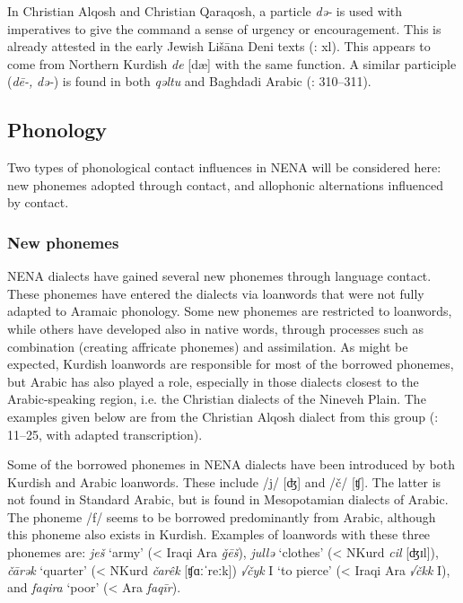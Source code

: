 \documentclass[output=paper]{langsci/langscibook}
\begin{document}
In Christian Alqosh and Christian Qaraqosh, a particle \textit{də\nobreakdash-} is used with imperatives to give the command a sense of urgency or encouragement. This is already attested in the early Jewish Lišāna Deni texts (\citealt{Sabar1976}: xl). This appears to come from Northern Kurdish \textit{de} [dæ] with the same function. A similar participle (\textit{dē\nobreakdash-,} \textit{də\nobreakdash-}) is found in both \textit{qəltu} and Baghdadi Arabic (\citealt{Jastrow1978}: 310–311).

\subsection{Phonology}

Two types of phonological contact influences in NENA will be considered here: new phonemes adopted through contact, and allophonic alternations influenced by contact.

\subsubsection{New phonemes}

NENA dialects have gained several new phonemes through language contact. These phonemes have entered the dialects via loanwords that were not fully adapted to Aramaic phonology. Some new phonemes are restricted to loanwords, while others have developed also in native words, through processes such as combination (creating affricate phonemes) and assimilation. As might be expected, Kurdish loanwords are responsible for most of the borrowed phonemes, but Arabic has also played a role, especially in those dialects closest to the Arabic-speaking region, i.e. the Christian dialects of the Nineveh Plain. The examples given below are from the Christian Alqosh dialect from this group (\citealt{Coghill2004}: 11–25, with adapted transcription).

Some of the borrowed phonemes in NENA dialects have been introduced by both Kurdish and Arabic loanwords. These include /j/ [ʤ] and /č/ [ʧ]. The latter is not found in Standard Arabic, but is found in Mesopotamian dialects of Arabic. The phoneme /f/ seems to be borrowed predominantly from Arabic, although this phoneme also exists in Kurdish. Examples of loanwords with these three phonemes are: \textit{ješ} ‘army’ (< Iraqi Ara \textit{ǧēš}), \textit{jullə} ‘clothes’ (< NKurd \textit{cil} [ʤɪl]), \textit{čārək} ‘quarter’ (< NKurd \textit{čarêk} [ʧɑːˈreːk]) \textit{√čyk} I ‘to pierce’ (< Iraqi Ara \textit{√čkk} I), and \textit{faqira} ‘poor’ (< Ara \textit{faqīr}).
\end{document}
